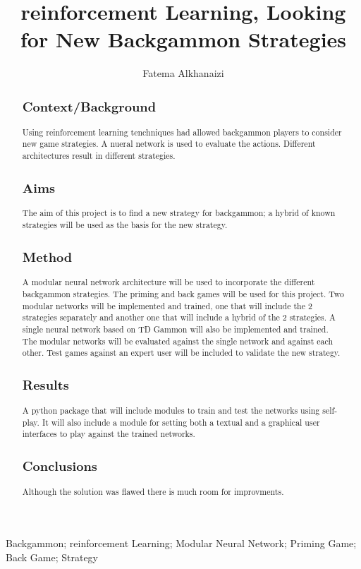 \documentclass[12pt,a4paper]{article}
\title{reinforcement Learning, Looking for New Backgammon Strategies}
\author{Fatema Alkhanaizi}
\date{}
\begin{document}
\maketitle

\begin{abstract}
\subsection{Context/Background}
Using reinforcement learning tenchniques had allowed backgammon players to consider new game strategies. A nueral network is used to evaluate the actions. Different architectures result in different strategies. 
\subsection{Aims}
The aim of this project is to find a new strategy for backgammon; a hybrid of known strategies will be used as the basis for the new strategy. 
\subsection{Method}
A modular neural network architecture will be used to incorporate the different backgammon strategies. The priming and back games will be used for this project. Two modular networks will be implemented and trained, one that will include the 2 strategies separately and another one that will include a hybrid of the 2 strategies. A single neural network based on TD Gammon will also be implemented and trained. The modular networks will be evaluated against the single network and against each other. Test games against an expert user will be included to validate the new strategy.
\subsection{Results}
A python package that will include modules to train and test the networks using self-play. It will also include a module for setting both a textual and a graphical user interfaces to play against the trained networks. 
\subsection{Conclusions}
Although the solution was flawed there is much room for improvments.
\end{abstract}

\begin{keywords}
Backgammon; reinforcement Learning; Modular Neural Network; Priming Game; Back Game; Strategy
\end{keywords}
\end{document}
